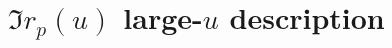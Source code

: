 \documentclass[11pt]{article}
\begin{document}
	\section{$\Im r_p(u)$ large-$u$ description} \label{sec:imrpasymptotic}



	\newpage
	\listoftodos
	\newpage
	\printbibliography
\end{document}
